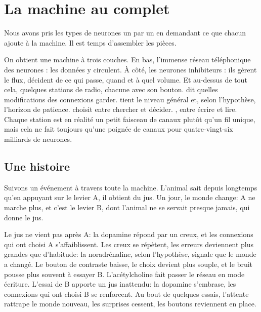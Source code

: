 \chapter{La machine au complet}


Nous avons pris les types de neurones un par un en demandant ce que chacun ajoute à la machine. Il est temps d'assembler les pièces.

On obtient une machine à trois couches. En bas, l'immense réseau téléphonique des neurones : les données y circulent. À côté, les neurones inhibiteurs : ils gèrent le flux, décident de ce qui passe, quand et à quel volume. Et au-dessus de tout cela, quelques stations de radio, chacune avec son bouton.  dit quelles modifications des connexions garder.  tient le niveau général et, selon l'hypothèse, l'horizon de patience.  choisit entre chercher et décider. , entre écrire et lire. Chaque station est en réalité un petit faisceau de canaux plutôt qu'un fil unique, mais cela ne fait toujours qu'une poignée de canaux pour quatre-vingt-six milliards de neurones.

\section*{Une histoire}

Suivons un événement à travers toute la machine. L'animal sait depuis longtemps qu'en appuyant sur le levier A, il obtient du jus. Un jour, le monde change: A ne marche plus, et c'est le levier B, dont l'animal ne se servait presque jamais, qui donne le jus.

Le jus ne vient pas après A: la dopamine répond par un creux, et les connexions qui ont choisi A s'affaiblissent. Les creux se répètent, les erreurs deviennent plus grandes que d'habitude: la noradrénaline, selon l'hypothèse, signale que le monde a changé. Le bouton de contraste baisse, le choix devient plus souple, et le bruit pousse plus souvent à essayer B. L'acétylcholine fait passer le réseau en mode écriture. L'essai de B apporte un jus inattendu: la dopamine s'embrase, les connexions qui ont choisi B se renforcent. Au bout de quelques essais, l'attente rattrape le monde nouveau, les surprises cessent, les boutons reviennent en place.

